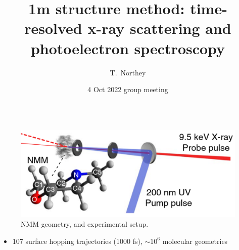 \documentclass{beamer}
\title{1m structure method: time-resolved x-ray scattering and photoelectron spectroscopy}
\author{T.\ Northey}
\date{4 Oct 2022 group meeting}
\begin{document}
\begin{frame}[plain]
    \maketitle
\end{frame}

\begin{frame}
	\begin{columns} 
		\begin{column}{.4\textwidth}
			\begin{figure}[H]
				\centering
				\includegraphics[width=\textwidth]{nmm_geometry.png}
				\caption{NMM geometry, and experimental setup.}
				\label{fig:nmm-geom}
			\end{figure}
		\begin{itemize}
			
			\item 107 surface hopping trajectories (1000 fs), $\sim$$10^6$ molecular geometries 
			

\end{itemize}
\end{column}
\end{columns}
\end{frame}
\end{document}
